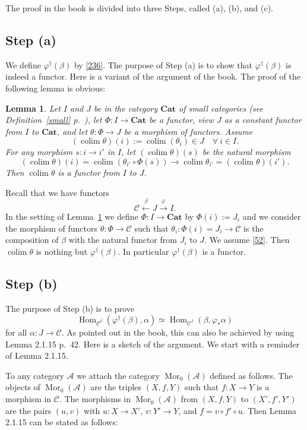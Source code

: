 \documentclass[12pt]{article}
\newtheorem{lem}[thm]{Lemma}
\theoremstyle{remark}
\theoremstyle{definition}
\newcommand{\A}{\mathcal A}
\newcommand{\C}{\mathcal C}
\newcommand{\Cat}{\mathbf{Cat}}%
\DeclareMathOperator*{\co}{colim}
\DeclareMathOperator{\Hom}{Hom}%
\DeclareMathOperator{\Mor}{Mor}
\begin{document}
The proof in the book is divided into three Steps, called (a), (b), and (c). 
%
\subsection{Step (a)}\label{scji} %
%
We define $\varphi^\dagger(\beta)$ by \eqref{236}. The purpose of Step (a) is to show that $\varphi^\dagger(\beta)$ is indeed a functor. Here is a variant of the argument of the book. The proof of the following lemma is obvious: 
%
\begin{lem}\label{r52}
%
Let $I$ and $J$ be in the category $\Cat$ of small categories (see Definition~\ref{small} p.~\pageref{small}), let $\Phi:I\to\Cat$ be a functor, view $J$ as a constant functor from $I$ to $\Cat$, and let $\theta:\Phi\to J$ be a morphism of functors. Assume 
%
\begin{equation}\label{52} 
(\co\theta)(i):=\co(\theta_i)\in J\quad\forall\ i\in I. 
\end{equation} 
%
For any morphism $s:i\to i'$ in $I$, let $(\co\theta)(s)$ be the natural morphism 
$$
(\co\theta)(i)=\co(\theta_{i'}\circ\Phi(s))\to
\co\theta_{i'}=(\co\theta)(i'). 
$$ 
Then $\co\theta$ is a functor from $I$ to $J$. 
%
\end{lem} 
%
Recall that we have functors 
$$
\C\xleftarrow\beta J\xrightarrow\varphi I. 
$$ 
In the setting of Lemma~\ref{r52} we define $\Phi:I\to\Cat$ by $\Phi(i):=J_i$ and we consider the morphism of functors $\theta:\Phi\to\C$ such that $\theta_i:\Phi(i)=J_i\to\C$ is the composition of $\beta$ with the natural functor from $J_i$ to $J$. We assume \eqref{52}. Then $\co\theta$ is nothing but $\varphi^\dagger(\beta)$. In particular $\varphi^\dagger(\beta)$ is a functor. 
%
\subsection{Step (b)} %
%
The purpose of Step (b) is to prove 
%
\begin{equation}\label{stepb}
\Hom_{\C^I}(\varphi^\dagger(\beta),\alpha)\simeq\Hom_{\C^J}(\beta,\varphi_*\alpha) 
\end{equation} 
% 
for all $\alpha:J\to\C$. As pointed out in the book, this can also be achieved by using Lemma 2.1.15 p.~42. Here is a sketch of the argument. We start with a reminder of Lemma 2.1.15. 

To any category $\A$ we attach the category $\Mor_0(\A)$ defined as follows. The objects of $\Mor_0(\A)$ are the triples $(X,f,Y)$ such that $f:X\to Y$ is a morphism in $\C$. The morphisms in $\Mor_0(\A)$ from $(X,f,Y)$ to $(X',f',Y')$ are the pairs $(u,v)$ with $u:X\to X'$, $v:Y'\to Y$, and $f=v\circ f'\circ u$. Then Lemma 2.1.15 can be stated as follows: 
\end{document}
